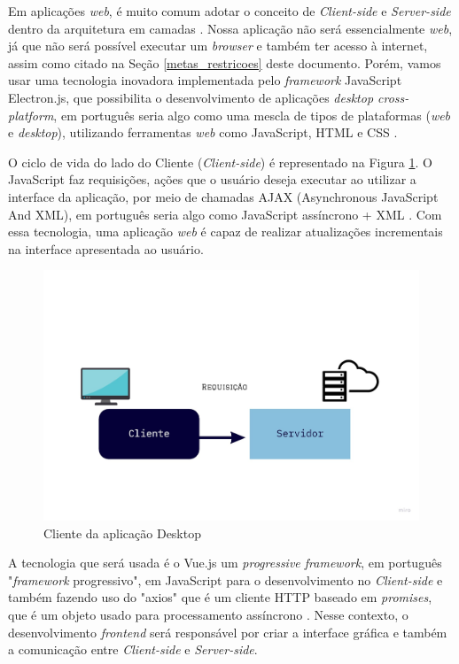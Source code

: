 \par Em aplicações \textit{web}, é muito comum adotar o conceito de \textit{Client-side} e \textit{Server-side} dentro da arquitetura em camadas \cite{ServerAndClient}. Nossa aplicação não será essencialmente \textit{web}, já que não será possível executar um \textit{browser} e também ter acesso à internet, assim como citado na Seção \ref{metas_restricoes} deste documento. Porém, vamos usar uma tecnologia inovadora implementada pelo \textit{framework} JavaScript Electron.js, que possibilita o desenvolvimento de aplicações \textit{desktop cross-platform}, em português seria algo como uma mescla de tipos de plataformas (\textit{web} e \textit{desktop}), utilizando ferramentas \textit{web} como JavaScript, HTML e CSS \cite{electron}.

\par O ciclo de vida do lado do Cliente (\textit{Client-side}) é representado na Figura \ref{fig:client-side}. O JavaScript faz requisições, ações que o usuário deseja executar ao utilizar a interface da aplicação, por meio de chamadas AJAX (Asynchronous JavaScript And XML), em português seria algo como JavaScript assíncrono + XML \cite{Ajax}. Com essa tecnologia, uma aplicação \textit{web} é capaz de realizar atualizações incrementais na interface apresentada ao usuário.

\begin{figure}[!h]
	\centering
		\includegraphics[keepaspectratio=true,scale=0.26]{figuras/client.jpg}
	\caption{Cliente da aplicação Desktop}
	\label{fig:client-side}
\end{figure}


\par A tecnologia que será usada é o Vue.js um \textit{progressive framework}, em português "\textit{framework} progressivo", em JavaScript para o desenvolvimento no \textit{Client-side} \cite{Vue} e também fazendo uso do "axios" que é um cliente HTTP baseado em \textit{promises}, que é um objeto usado para processamento assíncrono \cite{Promise}. Nesse contexto, o desenvolvimento \textit{frontend} será responsável por criar a interface gráfica e também a comunicação entre \textit{Client-side} e \textit{Server-side}. 


